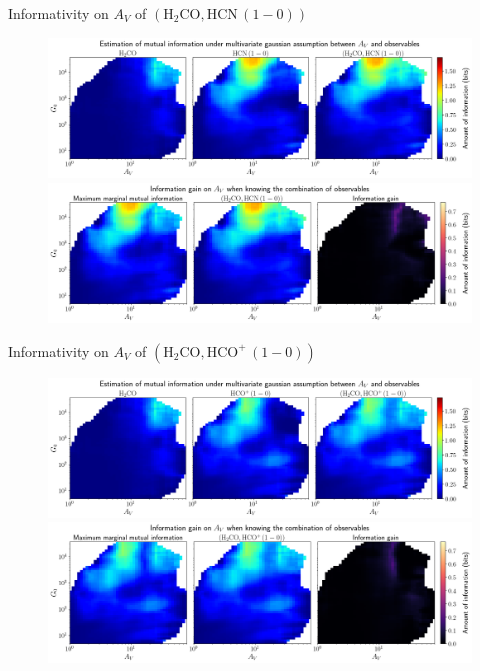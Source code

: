 \documentclass{beamer}
\begin{document}
\begin{frame}{Informativity on $A_V$ of $\left(\mathrm{H_2CO},\mathrm{HCN\,(1-0)}\right)$}
    \begin{figure}
        \centering
        \includegraphics[width=0.95\linewidth]{../linearinfo/av__h2co_hcn10_linearinfo.png}
        \vfill
        \includegraphics[width=0.95\linewidth]{../linearinfo/av__h2co_hcn10_linearinfo_gain.png}
    \end{figure}
\end{frame}

\begin{frame}{Informativity on $A_V$ of $\left(\mathrm{H_2CO},\mathrm{HCO^+\,(1-0)}\right)$}
    \begin{figure}
        \centering
        \includegraphics[width=0.95\linewidth]{../linearinfo/av__h2co_hcop10_linearinfo.png}
        \vfill
        \includegraphics[width=0.95\linewidth]{../linearinfo/av__h2co_hcop10_linearinfo_gain.png}
    \end{figure}
\end{frame}
\end{document}

